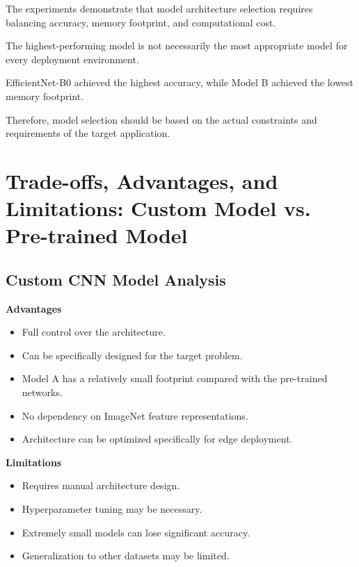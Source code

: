 \documentclass[12pt,a4paper]{report}
\begin{document}
The experiments demonstrate that model architecture selection
requires balancing accuracy, memory footprint, and computational
cost.

The highest-performing model is not necessarily the most
appropriate model for every deployment environment.

EfficientNet-B0 achieved the highest accuracy, while Model B
achieved the lowest memory footprint.

Therefore, model selection should be based on the actual
constraints and requirements of the target application.

\section{Trade-offs, Advantages, and Limitations:
Custom Model vs. Pre-trained Model}

\subsection{Custom CNN Model Analysis}

\textbf{Advantages}

\begin{itemize}
    \item Full control over the architecture.
    \item Can be specifically designed for the target problem.
    \item Model A has a relatively small footprint compared with
    the pre-trained networks.
    \item No dependency on ImageNet feature representations.
    \item Architecture can be optimized specifically for edge
    deployment.
\end{itemize}

\textbf{Limitations}

\begin{itemize}
    \item Requires manual architecture design.
    \item Hyperparameter tuning may be necessary.
    \item Extremely small models can lose significant accuracy.
    \item Generalization to other datasets may be limited.
\end{itemize}
\end{document}
